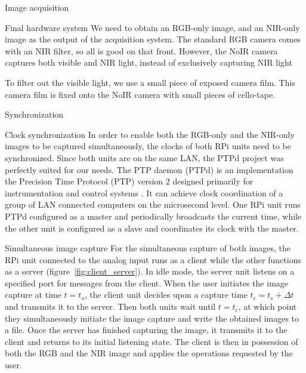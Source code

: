 \documentclass[10pt]{article}
\begin{document}
\begin{section}{Image acquisition}
\begin{subsubsection}{Final hardware system}
        We need to obtain an RGB-only image, and an NIR-only image as the output of the acquisition system. The standard RGB camera comes with an NIR filter, so all is good on that front. However, the NoIR camera captures both visible and NIR light, instead of exclusively capturing NIR light

        \medskip

        To filter out the visible light, we use a small piece of exposed camera film. This camera film is fixed onto the NoIR camera with small pieces of cello-tape.

    \end{subsubsection}

    \begin{subsection}{Synchronization}
        \label{sec:synchronization}
        \begin{subsubsection}{Clock synchronization}
            In order to enable both the RGB-only and the NIR-only images to be captured simultaneously, the clocks of both RPi units need to be synchronized. Since both units are on the same LAN, the PTPd project was perfectly suited for our needs. The PTP daemon (PTPd) is an implementation the Precision Time Protocol (PTP) version 2 designed primarily for instrumentation and control systems \cite{ptp}. It can achieve clock coordination of a group of LAN connected computers on the microsecond level. One RPi unit runs PTPd configured as a master and periodically broadcasts the current time, while the other unit is configured as a slave and coordinates its clock with the master.
        \end{subsubsection}

        \medskip
        \begin{subsubsection}{Simultaneous image capture}
            For the simultaneous capture of both images, the RPi unit connected to the analog input runs as a client while the other functions as a server (figure~\ref{fig:client_server}). In idle mode, the server unit listens on a specified port for messages from the client. When the user initiates the image capture at time $t=t_s$, the client unit decides upon a capture time $t_c=t_s+\Delta t$ and transmits it to the server. Then both units wait until $t=t_c$, at which point they simultaneously initiate the image capture and write the obtained images to a file. Once the server has finished capturing the image, it transmits it to the client and returns to its initial listening state. The client is then in possession of both the RGB and the NIR image and applies the operations requested by the  user.


\end{subsubsection}
\end{subsection}
\end{section}
\end{document}
